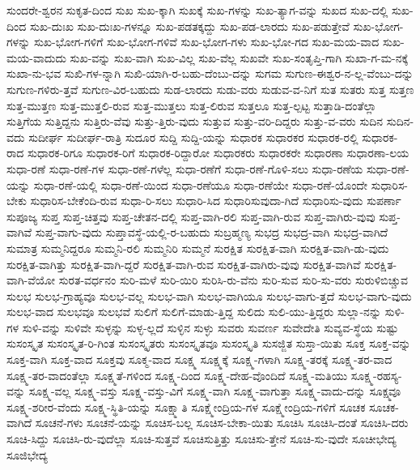 {ಸುಂದರೇ-ಶ್ವರನ
ಸುಕೃತ-ದಿಂದ
ಸುಖ
ಸುಖ-ಕ್ಕಾಗಿ
ಸುಖಕ್ಕೆ
ಸುಖ-ಗಳನ್ನು
ಸುಖ-ತ್ಯಾಗ-ವನ್ನು
ಸುಖದ
ಸುಖ-ದಲ್ಲಿ
ಸುಖ-ದಿಂದ
ಸುಖ-ದುಃಖ
ಸುಖ-ದುಃಖ-ಗಳನ್ನೂ
ಸುಖ-ಪಡತಕ್ಕದ್ದು
ಸುಖ-ಪಡ-ಲಾರದು
ಸುಖ-ಪಡುತ್ತೇವೆ
ಸುಖ-ಭೋಗ-ಗಳನ್ನು
ಸುಖ-ಭೋಗ-ಗಳಿಗೆ
ಸುಖ-ಭೋಗ-ಗಳಿವೆ
ಸುಖ-ಭೋಗ-ಗಳು
ಸುಖ-ಭೋ-ಗದ
ಸುಖ-ಮಯ-ವಾದ
ಸುಖ-ಮಯ-ವಾದುದು
ಸುಖ-ವನ್ನು
ಸುಖ-ವಾಗಿ
ಸುಖ-ವಿಲ್ಲ
ಸುಖ-ವೆಲ್ಲ
ಸುಖವೇ
ಸುಖ-ಸಂತೃಪ್ತಿ-ಗಾಗಿ
ಸುಖಾ-ಗ-ಮ-ನಕ್ಕೆ
ಸುಖಾ-ನು-ಭವ
ಸುಖಿ-ಗಳ-ನ್ನಾಗಿ
ಸುಖಿ-ಯಾಗಿ-ರ-ಬಹು-ದೆಂಬು-ದನ್ನು
ಸುಗಮ
ಸುಗುಣ-ಈಶ್ವರ-ನ-ಲ್ಲ-ವೆಂಬು-ದನ್ನು
ಸುಗುಣ-ಗಳಿರು-ತ್ತವೆ
ಸುಗುಣ-ವಿರ-ಬಹುದು
ಸುಡ-ಲಾರದು
ಸುಡು-ವರು
ಸುಡುವ-ವ-ನಿಗೆ
ಸುತ
ಸುತರು
ಸುತ್ತ
ಸುತ್ತಣ
ಸುತ್ತ-ಮುತ್ತಣ
ಸುತ್ತ-ಮುತ್ತಲಿ-ರುವ
ಸುತ್ತ-ಮುತ್ತಲು
ಸುತ್ತ-ಲಿರುವ
ಸುತ್ತಲೂ
ಸುತ್ತ-ಲ್ಪಟ್ಟ
ಸುತ್ತಾಡಿ-ದಂತೆಲ್ಲಾ
ಸುತ್ತಿಗೆಯ
ಸುತ್ತಿದ್ದನು
ಸುತ್ತಿರು-ವೆವು
ಸುತ್ತು-ತ್ತಿರು-ವುದು
ಸುತ್ತುವ
ಸುತ್ತು-ವರಿ-ದಿದ್ದರು
ಸುತ್ತು-ವ-ವರು
ಸುದಿನ
ಸುದಿನ-ವದು
ಸುದೀರ್ಘ
ಸುದೀರ್ಘ-ರಾತ್ರಿ
ಸುದೂರ
ಸುದ್ದಿ
ಸುದ್ದಿ-ಯನ್ನು
ಸುಧಾರಕ
ಸುಧಾರಕರ
ಸುಧಾರಕ-ರಲ್ಲಿ
ಸುಧಾರಕ-ರಾದ
ಸುಧಾರಕ-ರಿಗೂ
ಸುಧಾರಕ-ರಿಗೆ
ಸುಧಾರಕ-ರಿದ್ದಾರೋ
ಸುಧಾರಕರು
ಸುಧಾರಕರೇ
ಸುಧಾರಣಾ
ಸುಧಾರಣಾ-ಲಯ
ಸುಧಾ-ರಣೆ
ಸುಧಾ-ರಣೆ-ಗಳ
ಸುಧಾ-ರಣೆ-ಗಳೆಲ್ಲ
ಸುಧಾ-ರಣೆಗೆ
ಸುಧಾ-ರಣೆ-ಗೊಳಿ-ಸಲು
ಸುಧಾ-ರಣೆಯ
ಸುಧಾ-ರಣೆ-ಯನ್ನು
ಸುಧಾ-ರಣೆ-ಯಲ್ಲಿ
ಸುಧಾ-ರಣೆ-ಯಿಂದ
ಸುಧಾ-ರಣೆಯೂ
ಸುಧಾ-ರಣೆಯೇ
ಸುಧಾ-ರಣೆ-ಯೊಂದೇ
ಸುಧಾರಿಸ-ಬೇಕು
ಸುಧಾರಿಸ-ಬೇಕೆಂದಿ-ರುವ
ಸುಧಾ-ರಿ-ಸಲು
ಸುಧಾರಿ-ಸಿದ
ಸುಧಾರಿಸುವುದಾ-ಗಿದೆ
ಸುಧಾರಿಸು-ವುದು
ಸುಪರ್ಣಾ
ಸುಪೂಜ್ಯ
ಸುಪ್ತ
ಸುಪ್ತ-ಚಿತ್ತವು
ಸುಪ್ತ-ಚೇತನ-ದಲ್ಲಿ
ಸುಪ್ತ-ವಾಗಿ-ರಲಿ
ಸುಪ್ತ-ವಾಗಿ-ರುವ
ಸುಪ್ತ-ವಾಗಿರು-ವುವು
ಸುಪ್ತ-ವಾಗಿವೆ
ಸುಪ್ತ-ವಾಗು-ವುದು
ಸುಪ್ತಾವಸ್ಥೆ-ಯಲ್ಲಿ-ರ-ಬಹುದು
ಸುಬ್ರಹ್ಮಣ್ಯ
ಸುಭದ್ರ
ಸುಭದ್ರ-ವಾಗಿ
ಸುಭದ್ರ-ವಾಗಿದೆ
ಸುಮಾತ್ರ
ಸುಮ್ಮನಿದ್ದರೂ
ಸುಮ್ಮನಿ-ರಲಿ
ಸುಮ್ಮನಿರಿ
ಸುಮ್ಮನೆ
ಸುರಕ್ಷಿತ
ಸುರಕ್ಷಿತ-ವಾಗಿ
ಸುರಕ್ಷಿತ-ವಾಗಿ-ಡು-ವುದು
ಸುರಕ್ಷಿತ-ವಾಗಿತ್ತು
ಸುರಕ್ಷಿತ-ವಾಗಿ-ದ್ದರೆ
ಸುರಕ್ಷಿತ-ವಾಗಿ-ರುವ
ಸುರಕ್ಷಿತ-ವಾಗಿರು-ವುವು
ಸುರಕ್ಷಿತ-ವಾಗಿವೆ
ಸುರಕ್ಷಿತ-ವಾಗಿ-ವೆಯೋ
ಸುರತ-ವರ್ಧನಂ
ಸುರಿ-ಮಳೆ
ಸುರಿ-ಯಿರಿ
ಸುರಿಸಿ-ರು-ವೆನು
ಸುರಿ-ಸುವ
ಸುರಿ-ಸು-ವರು
ಸುರುಳಿಬಿಚ್ಚುವ
ಸುಲಭ
ಸುಲಭ-ಗ್ರಾಹ್ಯವೂ
ಸುಲಭ-ವಲ್ಲ
ಸುಲಭ-ವಾಗಿ
ಸುಲಭ-ವಾಗಿಯೂ
ಸುಲಭ-ವಾಗು-ತ್ತದೆ
ಸುಲಭ-ವಾಗು-ವುದು
ಸುಲಭ-ವಾದ
ಸುಲಭವೂ
ಸುಲಭವೆ
ಸುಲಿಗೆ
ಸುಲಿಗೆ-ಮಾಡು-ತ್ತಿದ್ದ
ಸುಲಿದು
ಸುಲಿ-ಯು-ತ್ತಿದ್ದರು
ಸುಲ್ಲಾ-ನನ್ನು
ಸುಳಿ-ಗಳ
ಸುಳಿ-ವನ್ನು
ಸುಳಿವೇ
ಸುಳ್ಳನ್ನು
ಸುಳ್ಳ-ಲ್ಲದೆ
ಸುಳ್ಳಿನ
ಸುಳ್ಳು
ಸುವರು
ಸುವರ್ಣ
ಸುವೇದೇತಿ
ಸುವ್ಯವ-ಸ್ಥೆಯ
ಸುಷ್ಟು
ಸುಸಂಸ್ಕೃತ
ಸುಸಂಸ್ಕೃತ-ರಿ-ಗಿಂತ
ಸುಸಂಸ್ಕೃತರು
ಸುಸಂಸ್ಕೃತವೂ
ಸುಸಂಸ್ಕೃತಿ
ಸುಸಜ್ಜಿತ
ಸುಸ್ತಾ-ಯಿತು
ಸೂಕ್ತ
ಸೂಕ್ತ-ವನ್ನು
ಸೂಕ್ತ-ವಾಗಿ
ಸೂಕ್ತ-ವಾದ
ಸೂಕ್ತವು
ಸೂಕ್ಮ-ವಾದ
ಸೂಕ್ಷ್ಮ
ಸೂಕ್ಷ್ಮಕ್ಕೆ
ಸೂಕ್ಷ್ಮ-ಗಳಾಗಿ
ಸೂಕ್ಷ್ಮ-ತರಕ್ಕೆ
ಸೂಕ್ಷ್ಮ-ತರ-ವಾದ
ಸೂಕ್ಷ್ಮ-ತರ-ವಾದಂತೆಲ್ಲಾ
ಸೂಕ್ಷ್ಮತೆ-ಗಳಿಂದ
ಸೂಕ್ಷ್ಮ-ದಿಂದ
ಸೂಕ್ಷ್ಮ-ದೇಹ-ವೊಂದಿದೆ
ಸೂಕ್ಷ್ಮ-ಮತಿಯು
ಸೂಕ್ಷ್ಮ-ರಹಸ್ಯ-ವನ್ನು
ಸೂಕ್ಷ್ಮ-ವಲ್ಲ
ಸೂಕ್ಷ್ಮ-ವಸ್ತು
ಸೂಕ್ಷ್ಮ-ವಸ್ತು-ವಿಗೆ
ಸೂಕ್ಷ್ಮ-ವಾಗಿ
ಸೂಕ್ಷ್ಮ-ವಾಗುತ್ತಾ
ಸೂಕ್ಷ್ಮ-ವಾದು-ದನ್ನು
ಸೂಕ್ಷ್ಮವೂ
ಸೂಕ್ಷ್ಮ-ಶರೀರ-ವೆಂದು
ಸೂಕ್ಷ್ಮ-ಸ್ಥಿತಿ-ಯನ್ನು
ಸೂಕ್ಷ್ಮಾತಿ
ಸೂಕ್ಷ್ಮೇಂದ್ರಿಯ-ಗಳ
ಸೂಕ್ಷ್ಮೇಂದ್ರಿಯ-ಗಳಿಗೆ
ಸೂಚಕ
ಸೂಚಕ-ವಾಗಿದೆ
ಸೂಚನೆ-ಗಳು
ಸೂಚನೆ-ಯನ್ನು
ಸೂಚಿಸ-ಬಲ್ಲ
ಸೂಚಿಸ-ಬೇಕಾ-ಯಿತು
ಸೂಚಿಸಿ
ಸೂಚಿಸಿ-ದಂತೆ
ಸೂಚಿಸಿ-ದರು
ಸೂಚಿ-ಸಿದ್ದು
ಸೂಚಿಸಿ-ರು-ವುದೆಲ್ಲಾ
ಸೂಚಿ-ಸುತ್ತವೆ
ಸೂಚಿಸುತ್ತಿತ್ತು
ಸೂಚಿಸು-ತ್ತೇನೆ
ಸೂಚಿ-ಸು-ವುದೇ
ಸೂಚೀಭೇದ್ಯ
ಸೂಜಿಭೇದ್ಯ
}
